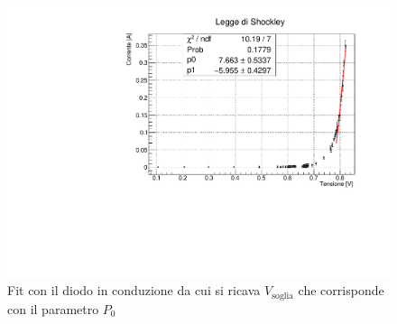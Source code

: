 \begin{figure}[h!]
    \centering
    \includegraphics[scale=.5]{Immagini/diodo_soglia2.pdf}
    \caption{Fit con il diodo in conduzione da cui si ricava $V_{\text{soglia}}$ che corrisponde con il parametro $P_0$}
    \label{fig:my_label}
\end{figure}